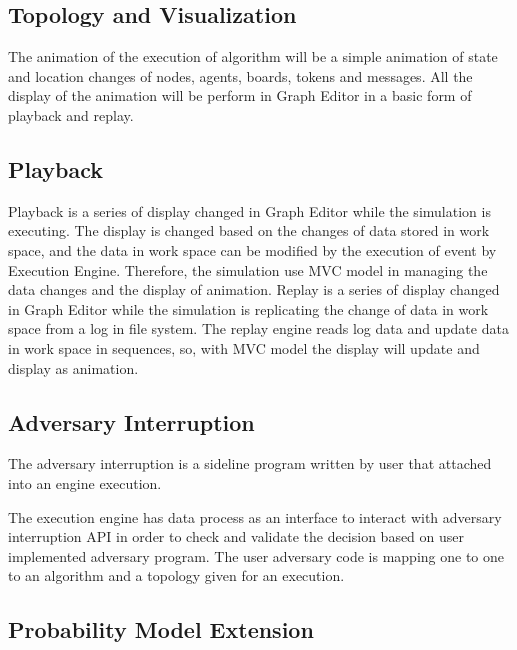 \subsection{Topology and Visualization }

The animation of the execution of algorithm will be a simple animation of state and location changes of nodes, agents, boards, tokens and messages. All the display of the animation will be perform in Graph Editor in a basic form of playback and replay.


\subsection{Playback}
Playback is a series of display changed in Graph Editor while the simulation is executing. The display is changed based on the changes of data stored in work space, and the data in work space can be modified by the execution of event by Execution Engine. Therefore, the simulation use MVC model in managing the data changes and the display of animation.
Replay is a series of display changed in Graph Editor while the simulation is replicating the change of data in work space from a log in file system. The replay engine reads log data and update data in work space in sequences, so, with MVC model the display will update and display as animation.


\subsection{Adversary Interruption}

The adversary interruption is a sideline program written by user that attached into an engine execution.



The execution engine has data process as an interface to interact with adversary interruption API in order to check and validate the decision based on user implemented adversary program. The user adversary code is mapping one to one to an algorithm and a topology given for an execution.

\subsection{Probability Model Extension}

